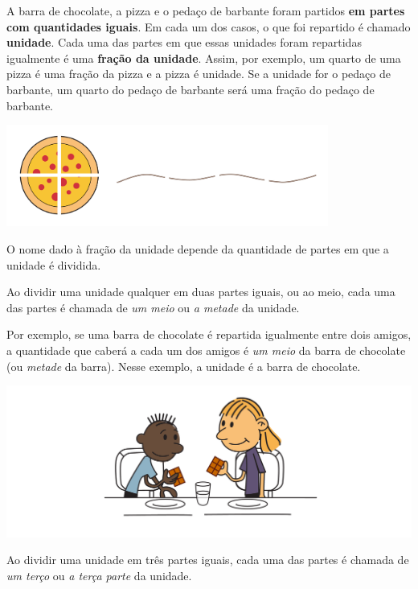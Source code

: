 A barra de chocolate, a pizza e o pedaço de barbante foram partidos {\bf em partes com quantidades iguais}.
Em cada um dos casos, o que foi repartido é chamado {\bf unidade}. Cada uma das partes em que essas unidades foram repartidas igualmente é uma {\bf fração da unidade}. Assim, por exemplo, um quarto de uma pizza é uma fração da pizza e a pizza é unidade. Se a unidade for o pedaço de barbante, um quarto do pedaço de barbante será uma fração do pedaço de barbante.

\begin{center}
    \includegraphics[width=300pt, keepaspectratio]{../figuras/licao01/orgideias_fig01.png}
  \end{center}

O nome dado à fração da unidade depende da quantidade de partes em que a unidade é dividida.

Ao dividir uma unidade qualquer em duas partes iguais, ou ao meio, cada uma das partes é chamada de {\it um meio} ou {\it a metade} da unidade.

Por exemplo, se uma barra de chocolate é repartida igualmente entre dois amigos, a quantidade que caberá a cada um dos amigos é {\it um meio} da barra de chocolate (ou {\it metade} da barra). Nesse exemplo, a unidade é a barra de chocolate.

\begin{center}
    \includegraphics[width=400pt, keepaspectratio]{../figuras/licao01/orgideias_fig02.png}
  \end{center}

Ao dividir uma unidade em três partes iguais, cada uma das partes é chamada de {\it um terço} ou {\it a terça parte} da unidade.


